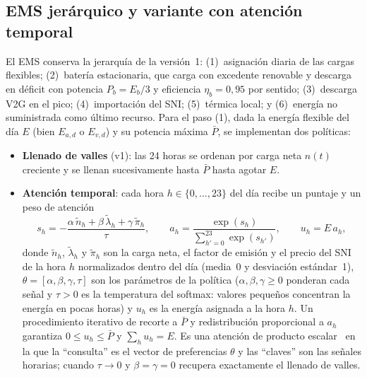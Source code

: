 \documentclass[11pt,a4paper]{article}
\begin{document}
\subsection{EMS jer\'arquico y variante con atenci\'on temporal}
\label{sec:ems}
El EMS conserva la jerarqu\'ia de la versi\'on~1: (1)~asignaci\'on diaria de las cargas
flexibles; (2)~bater\'ia estacionaria, que carga con excedente renovable y descarga en
d\'eficit con potencia $P_b=E_b/3$ y eficiencia $\eta_b=0{,}95$ por sentido;
(3)~descarga V2G en el pico; (4)~importaci\'on del SNI; (5)~t\'ermica local; y
(6)~energ\'ia no suministrada como \'ultimo recurso. Para el paso (1), dada la energ\'ia
flexible del d\'ia $E$ (bien $E_{a,d}$ o $E_{v,d}$) y su potencia m\'axima $\bar P$, se
implementan dos pol\'iticas:
\begin{itemize}[leftmargin=1.4em]
  \item \textbf{Llenado de valles} (v1): las 24 horas se ordenan por carga neta
  $n(t)$ creciente y se llenan sucesivamente hasta $\bar P$ hasta agotar $E$.
  \item \textbf{Atenci\'on temporal}: cada hora $h\in\{0,\dots,23\}$ del d\'ia recibe un
  puntaje y un peso de atenci\'on
  \begin{equation}
  s_h = -\frac{\alpha\,\tilde n_h + \beta\,\tilde\lambda_h + \gamma\,\tilde\pi_h}{\tau}, \qquad
  a_h = \frac{\exp(s_h)}{\sum_{h'=0}^{23}\exp(s_{h'})}, \qquad
  u_h = E\,a_h,
  \label{eq:att}
  \end{equation}
  donde $\tilde n_h$, $\tilde\lambda_h$ y $\tilde\pi_h$ son la carga neta, el factor de
  emisi\'on y el precio del SNI de la hora $h$ normalizados dentro del d\'ia (media~0 y
  desviaci\'on est\'andar~1), $\theta=[\alpha,\beta,\gamma,\tau]$ son los par\'ametros de
  la pol\'itica ($\alpha,\beta,\gamma\ge0$ ponderan cada se\~nal y $\tau>0$ es la
  temperatura del softmax: valores peque\~nos concentran la energ\'ia en pocas horas) y
  $u_h$ es la energ\'ia asignada a la hora $h$. Un procedimiento iterativo de recorte a
  $\bar P$ y redistribuci\'on proporcional a $a_h$ garantiza $0\le u_h\le\bar P$ y
  $\sum_h u_h=E$. Es una atenci\'on de producto escalar~\cite{vaswani2017} en la que la
  ``consulta'' es el vector de preferencias $\theta$ y las ``claves'' son las se\~nales
  horarias; cuando $\tau\to0$ y $\beta=\gamma=0$ recupera exactamente el llenado de valles.
\end{itemize}
\end{document}
